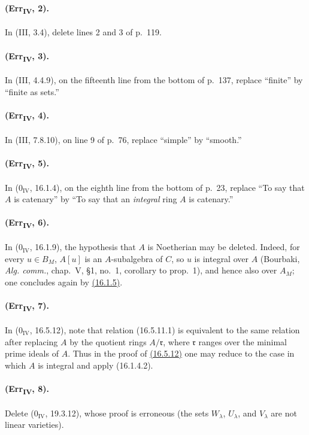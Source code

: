 \paragraph{(Err\textsubscript{IV}, 2).}
In (III, 3.4), delete lines 2 and 3 of p.~119.

\paragraph{(Err\textsubscript{IV}, 3).}
In (III, 4.4.9), on the fifteenth line from the bottom of p.~137,
replace ``finite'' by ``finite as sets.''

\paragraph{(Err\textsubscript{IV}, 4).}
In (III, 7.8.10), on line 9 of p.~76, replace ``simple'' by ``smooth.''

\paragraph{(Err\textsubscript{IV}, 5).}
In ($0_{\mathrm{IV}}$, 16.1.4), on the eighth line from the bottom of
p.~23, replace ``To say that $A$ is catenary'' by ``To say that an
\emph{integral} ring $A$ is catenary.''

\paragraph{(Err\textsubscript{IV}, 6).}
In ($0_{\mathrm{IV}}$, 16.1.9), the hypothesis that $A$ is Noetherian
may be deleted.  Indeed, for every $u\in B_M$, $A[u]$ is an
$A$-subalgebra of $C$, so $u$ is integral over $A$ (Bourbaki,
\emph{Alg. comm.}, chap.~V, \S1, no.~1, corollary to prop.~1), and
hence also over $A_M$; one concludes again by {\hyperlink{ega4.c04.prop.16-1-5}{(16.1.5)}}.

\paragraph{(Err\textsubscript{IV}, 7).}
In ($0_{\mathrm{IV}}$, 16.5.12), note that relation (16.5.11.1) is
equivalent to the same relation after replacing $A$ by the quotient rings
$A/\mathfrak r$, where $\mathfrak r$ ranges over the minimal prime ideals
of $A$.  Thus in the proof of {\hyperlink{ega4.c04.statement.16-5-12}{(16.5.12)}} one may reduce to the case in
which $A$ is integral and apply (16.1.4.2).

\paragraph{(Err\textsubscript{IV}, 8).}
Delete ($0_{\mathrm{IV}}$, 19.3.12), whose proof is erroneous (the sets
$W_\lambda$, $U_\lambda$, and $V_\lambda$ are not linear varieties).

